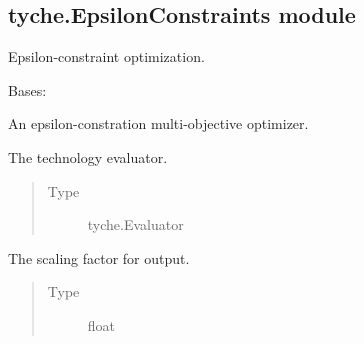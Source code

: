 \documentclass[letterpaper,10pt,english]{sphinxmanual}
\begin{document}
\subsection{tyche.EpsilonConstraints module}
\label{\detokenize{tyche:module-tyche.EpsilonConstraints}}\label{\detokenize{tyche:tyche-epsilonconstraints-module}}
Epsilon-constraint optimization.

\begin{fulllineitems}
\label{\detokenize{tyche:tyche.EpsilonConstraints.EpsilonConstraintOptimizer}}
Bases: 

An epsilon-constration multi-objective optimizer.

\begin{fulllineitems}
\label{\detokenize{tyche:tyche.EpsilonConstraints.EpsilonConstraintOptimizer.evaluator}}
The technology evaluator.
\begin{quote}\begin{description}
\item[{Type}] \leavevmode
tyche.Evaluator

\end{description}\end{quote}

\end{fulllineitems}


\begin{fulllineitems}
\label{\detokenize{tyche:tyche.EpsilonConstraints.EpsilonConstraintOptimizer.scale}}
The scaling factor for output.
\begin{quote}\begin{description}
\item[{Type}] \leavevmode
float


\end{description}
\end{quote}
\end{fulllineitems}
\end{fulllineitems}
\end{document}
